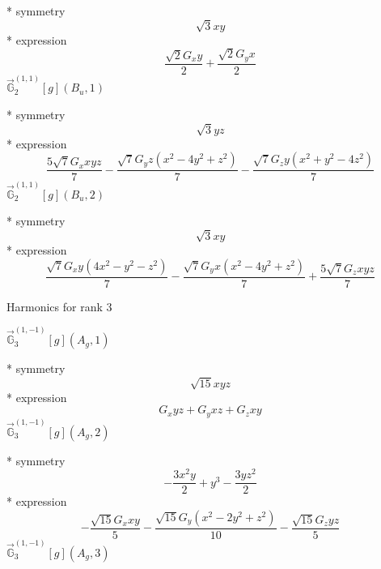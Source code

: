 \documentclass[fleqn,8pt]{jsarticle}
\begin{document}
\noindent\quad ** symmetry
\begin{dmath*}
\sqrt{3} x y
\end{dmath*}
\noindent\quad ** expression
\begin{dmath*}
\frac{\sqrt{2} G_{x} y}{2} + \frac{\sqrt{2} G_{y} x}{2}
\end{dmath*}
\noindent\quad $\vec{\mathbb{G}}_{2}^{(1,1)}[g](B_{u},1)$

\noindent\quad ** symmetry
\begin{dmath*}
\sqrt{3} y z
\end{dmath*}
\noindent\quad ** expression
\begin{dmath*}
\frac{5 \sqrt{7} G_{x} x y z}{7} - \frac{\sqrt{7} G_{y} z \left(x^{2} - 4 y^{2} + z^{2}\right)}{7} - \frac{\sqrt{7} G_{z} y \left(x^{2} + y^{2} - 4 z^{2}\right)}{7}
\end{dmath*}
\noindent\quad $\vec{\mathbb{G}}_{2}^{(1,1)}[g](B_{u},2)$

\noindent\quad ** symmetry
\begin{dmath*}
\sqrt{3} x y
\end{dmath*}
\noindent\quad ** expression
\begin{dmath*}
\frac{\sqrt{7} G_{x} y \left(4 x^{2} - y^{2} - z^{2}\right)}{7} - \frac{\sqrt{7} G_{y} x \left(x^{2} - 4 y^{2} + z^{2}\right)}{7} + \frac{5 \sqrt{7} G_{z} x y z}{7}
\end{dmath*}

\noindent * Harmonics for rank 3

\noindent\quad $\vec{\mathbb{G}}_{3}^{(1,-1)}[g](A_{g},1)$

\noindent\quad ** symmetry
\begin{dmath*}
\sqrt{15} x y z
\end{dmath*}
\noindent\quad ** expression
\begin{dmath*}
G_{x} y z + G_{y} x z + G_{z} x y
\end{dmath*}
\noindent\quad $\vec{\mathbb{G}}_{3}^{(1,-1)}[g](A_{g},2)$

\noindent\quad ** symmetry
\begin{dmath*}
- \frac{3 x^{2} y}{2} + y^{3} - \frac{3 y z^{2}}{2}
\end{dmath*}
\noindent\quad ** expression
\begin{dmath*}
- \frac{\sqrt{15} G_{x} x y}{5} - \frac{\sqrt{15} G_{y} \left(x^{2} - 2 y^{2} + z^{2}\right)}{10} - \frac{\sqrt{15} G_{z} y z}{5}
\end{dmath*}
\noindent\quad $\vec{\mathbb{G}}_{3}^{(1,-1)}[g](A_{g},3)$
\end{document}

